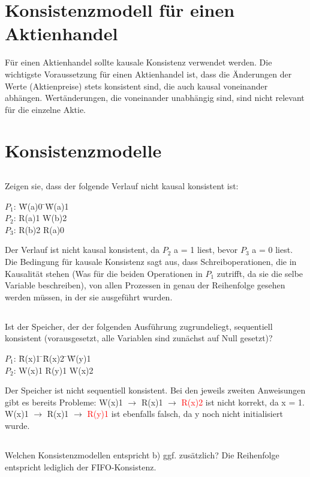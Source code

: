 \documentclass[a4paper,9pt]{article}
\begin{document}
\section{Konsistenzmodell f\"ur einen Aktienhandel}
F\"ur einen Aktienhandel sollte kausale Konsistenz verwendet werden. Die wichtigste Voraussetzung f\"ur einen Aktienhandel ist, dass die \"Anderungen der Werte (Aktienpreise) stets konsistent sind, die auch kausal voneinander abh\"angen. Wert\"anderungen, die voneinander unabh\"angig sind, sind nicht relevant f\"ur die einzelne Aktie. 

\section{Konsistenzmodelle}
\subsection{}
Zeigen sie, dass der folgende Verlauf nicht kausal konsistent ist:

\begin{tabbing}
$P_{1}$: \= W(a)0 \= \quad \= W(a)1 \\
$P_{2}$: \> R(a)1 \> \quad \> W(b)2 \\
$P_{3}$: \> R(b)2 \> \quad \> R(a)0
\end{tabbing}

Der Verlauf ist nicht kausal konsistent, da $P_{2}$ a = 1 liest, bevor $P_{3}$ a = 0 liest. Die Bedingung f\"ur kausale Konsistenz sagt aus, dass Schreiboperationen, die in Kausalit\"at stehen (Was f\"ur die beiden Operationen in $P_{1}$ zutrifft, da sie die selbe Variable beschreiben), von allen Prozessen in genau der Reihenfolge gesehen werden m\"ussen, in der sie ausgef\"uhrt wurden.

\subsection{}
Ist der Speicher, der der folgenden Ausf\"uhrung zugrundeliegt, sequentiell konsistent (vorausgesetzt, alle Variablen sind zun\"achst auf Null gesetzt)?

\begin{tabbing}
$P_{1}$: \= R(x)1 \= \quad \= R(x)2 \= \quad \= W(y)1 \\
$P_{2}$: \> W(x)1 \> \quad \> R(y)1 \> \quad \> W(x)2
\end{tabbing}

Der Speicher ist nicht sequentiell konsistent. Bei den jeweils zweiten Anweisungen gibt es bereits Probleme: \newline
W(x)1 $\rightarrow$ R(x)1 $\rightarrow$ \textcolor{red}{R(x)2} ist nicht korrekt, da x = 1. \newline
W(x)1 $\rightarrow$ R(x)1 $\rightarrow$ \textcolor{red}{R(y)1} ist ebenfalls falsch, da y noch nicht initialisiert wurde.

\subsection{}
Welchen Konsistenzmodellen entspricht b) ggf. zus\"atzlich? \newline
Die Reihenfolge entspricht lediglich der FIFO-Konsistenz.
\end{document}
